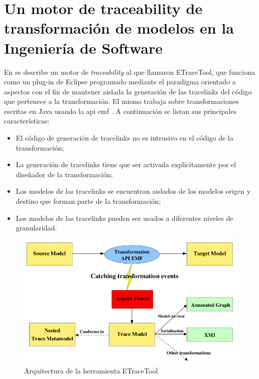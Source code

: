 \documentclass[a4paper,12pt,oneside,spanish]{book}
\begin{document}
\bigskip


\minitoc 


\pagebreak


\section{Un motor de traceability de transformación de modelos en la Ingeniería de Software}

En \cite{AmarLeblancCoulette} se describe un motor de \textit{traceability} al que llamaron ETraceTool, que funciona como un plug-in de \textsf{Eclipse} programado mediante el paradigma orientado a aspectos con el fin de mantener aislada la generación de las tracelinks del código que pertenece a la transformación. El mismo trabaja sobre transformaciones escritas en \textsf{Java} usando la \gls{api} \gls{emf} \cite{EMF}. A continuación se listan sus principales características:

\begin{itemize}
\item El código de generación de tracelinks no es intrusivo en el código de la transformación;
\item La generación de tracelinks tiene que ser activada explícitamente por el diseñador de la transformación;
\item Los modelos de las tracelinks se encuentran aislados de los modelos origen y destino que forman parte de la transformación;
\item Los modelos de las tracelinks pueden ser usados a diferentes niveles de granularidad.
\end{itemize}

\begin{figure}[hbtp]
\centering
\includegraphics[scale=0.55]{./img/ETraceTool_Arquitectura}
\caption{Arquitectura de la herramienta ETraceTool}
\label{fig:ArqETraceTool}
\end{figure}
\end{document}
